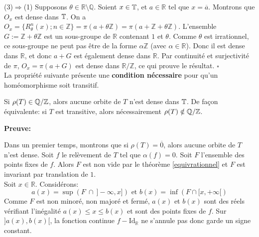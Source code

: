 	\par(3)$\Rightarrow$(1) Supposons $\theta \in \mathbb{R} \setminus \mathbb{Q}$. Soient $x\in {\mathbb{T}}$, et $a \in \mathbb{R}$ tel que $x = \overline{a}$. Montrons que $O_x$ est dense dans ${\mathbb{T}}$. On a $O_x=\lbrace R_{\theta}^n(x); n \in \mathbb{Z} \rbrace = \pi ( a + \theta \mathbb{Z} )=\pi ( a + \mathbb{Z} + \theta \mathbb{Z} )$. L'ensemble $G := \mathbb{Z} + \theta \mathbb{Z}$ est un sous-groupe de $\mathbb{R}$  contenant $1$ et $\theta$. Comme $\theta$ est irrationnel, ce sous-groupe ne peut pas être de la forme $\alpha \mathbb{Z}$ (avec $\alpha \in \mathbb{R}$). Donc il est dense dans $\mathbb{R}$, et donc $a+G$ est également dense dans $\mathbb{R}$. Par continuité et surjectivité de $\pi$, $O_x = \pi(a+G)$ est dense dans $\mathbb{R} / \mathbb{Z}$, ce qui prouve le résultat. \hfill $\square$\\




La propriété suivante présente une \textbf{condition nécessaire} pour qu'un homéomorphisme soit transitif.\\








\begin{proposition}\label{trans et nb rotation ratio}
	Si $\rho(T) \in \mathbb{Q}/\mathbb{Z}$, alors aucune orbite de $T$ n'est dense dans ${\mathbb{T}}$. De façon équivalente: si $T$ est transitive, alors nécessairement $\rho(T) \notin \mathbb{Q}/\mathbb{Z}$.
\end{proposition}


\textbf{Preuve:}
	\par Dans un premier temps, montrons que si $\rho(T)= \overline{0}$, alors aucune orbite de $T$ n'est dense. Soit $f$ le relèvement de $T$ tel que $\alpha(f)=0$. Soit $F$ l'ensemble des points fixes de $f$. Alors $F$ est non vide par le théorème \ref{equivrationnel} et $F$ est invariant par translation de $1$.\\
	Soit $x \in \mathbb{R}$. Considérons:
	$$a(x)=\sup (F\ \cap \ ]-\infty,x]) \text{ et } b(x)=\inf(F \cap [x,+\infty[)$$
	Comme $F$ est non minoré, non majoré et fermé, $a(x)$ et $b(x)$ sont des réels vérifiant l'inégalité $a(x)\leq x\leq b(x)$ et sont des points fixes de $f$. Sur $]a(x),b(x)[$,  la fonction continue $f - \mathrm{Id_{\mathbb{R}}}$ ne s'annule pas donc garde un signe constant.\\

